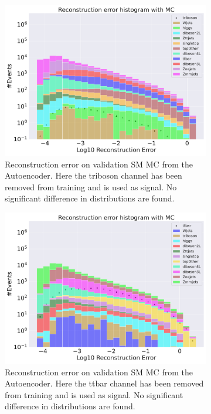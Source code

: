 \begin{figure}[h!]
    \centering
    \begin{subfigure}{.8\textwidth}
        \includegraphics[width=\textwidth]{Figures/AE_testing/small/b_data_recon_big_rm3_feats_sig_triboson.pdf}
        \caption{Reconstruction error on validation SM MC from the Autoencoder. Here the triboson channel has been removed from training and 
        is used as signal. No significant difference in distributions are found. }
        \label{fig:ae_small_triboson}
    \end{subfigure}
    \hfill
    \begin{subfigure}{.8\textwidth}
        \includegraphics[width=\textwidth]{Figures/AE_testing/small/b_data_recon_big_rm3_feats_sig_ttbar.pdf}
        \caption{Reconstruction error on validation SM MC from the Autoencoder. Here the ttbar channel has been removed from training and 
        is used as signal. No significant difference in distributions are found. }
        \label{fig:ae_small_ttbar}
    \end{subfigure}
    \hfill        
    \caption{ }
    \label{fig:ae_small_channel4}
\end{figure}

